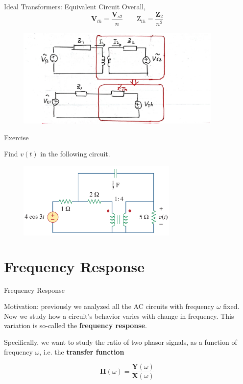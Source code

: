 \documentclass{beamer}
\begin{document}
\begin{frame}{Ideal Transformers: Equivalent Circuit}
Overall, 
$$\mathbf{V}_{th}=\frac{\mathbf{V}_{s2}}{n} \qquad \mathrm{Z}_{th} = \frac{\mathbf{Z}_2}{n^2}$$

\begin{figure}[H]
        \centering
        \includegraphics[width=0.9\textwidth]{C13/equi.jpeg}
\end{figure}
\end{frame}

\begin{frame}{Exercise}

Find $v(t)$ in the following circuit.
\begin{figure}[H]
        \centering
        \includegraphics[width=0.7\textwidth]{C13/12.png}
    \end{figure}
\end{frame}



\section{Frequency Response}

\begin{frame}{Frequency Response}

Motivation: previously we analyzed all the AC circuits with frequency $\omega$ fixed. Now we study how a circuit's behavior varies with change in frequency. This variation is so-called the \textbf{frequency response}.

\vspace{0.3cm}

Specifically, we want to study the ratio of two phasor signals, as a function of frequency $\omega$, i.e. the \textbf{transfer function}

$$\mathbf{H}(\omega) = \frac{\mathbf{Y}(\omega)}{\mathbf{X}(\omega)}$$


\end{frame}
\end{document}
